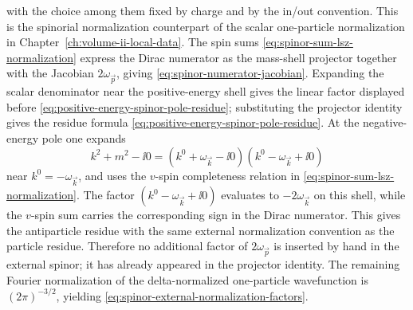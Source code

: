 with the choice among them fixed by charge and by the in/out convention.  This
is the spinorial normalization counterpart of the scalar one-particle
normalization in Chapter~\ref{ch:volume-ii-local-data}.
The spin sums \eqref{eq:spinor-sum-lsz-normalization} express the Dirac
numerator as the mass-shell projector together with the Jacobian
\(2\omega_{\vec p}\), giving
\eqref{eq:spinor-numerator-jacobian}.  Expanding the scalar denominator near
the positive-energy shell gives the linear factor displayed before
\eqref{eq:positive-energy-spinor-pole-residue}; substituting the projector
identity gives the residue formula
\eqref{eq:positive-energy-spinor-pole-residue}.  At the negative-energy pole
one expands
\[
  k^2+m^2-\ii0
  =
  (k^0+\omega_{\vec k}-\ii0)(k^0-\omega_{\vec k}+\ii0)
\]
near \(k^0=-\omega_{\vec k}\), and uses the \(v\)-spin completeness relation
in \eqref{eq:spinor-sum-lsz-normalization}.  The factor
\((k^0-\omega_{\vec k}+\ii0)\) evaluates to \(-2\omega_{\vec k}\) on this
shell, while the \(v\)-spin sum carries the corresponding sign in the
Dirac numerator.  This gives the antiparticle residue with the same
external normalization convention as the particle residue.  Therefore no
additional factor of
\(2\omega_{\vec p}\) is inserted by hand in the external spinor; it has
already appeared in the projector identity.  The remaining Fourier
normalization of the delta-normalized one-particle wavefunction is
\((2\pi)^{-3/2}\), yielding
\eqref{eq:spinor-external-normalization-factors}.

